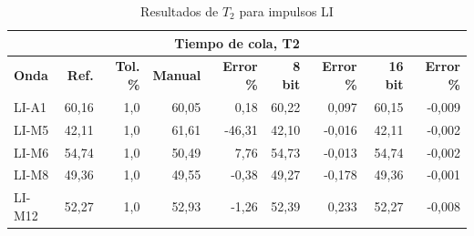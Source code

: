 \vspace{3\baselineskip}
\begin{table}[H]
    \centering
    \begin{tabular}{@{}lrrrrrrrr@{}}
        \toprule
        \multicolumn{9}{c}{\textbf{Tiempo de cola, T2}}                                                                                                                   \\ \midrule
        \textbf{Onda} & \textbf{Ref.} & \textbf{Tol. \%} & \textbf{Manual} & \textbf{Error \%} & \textbf{8 bit} & \textbf{Error \%} & \textbf{16 bit} & \textbf{Error \%} \\ \midrule
        LI-A1         & 60,16         & 1,0              & 60,05           & 0,18              & 60,22          & 0,097             & 60,15           & -0,009            \\ \midrule
        LI-M5         & 42,11         & 1,0              & 61,61           & -46,31            & 42,10          & -0,016            & 42,11           & -0,002            \\ \midrule
        LI-M6         & 54,74         & 1,0              & 50,49           & 7,76              & 54,73          & -0,013            & 54,74           & -0,002            \\ \midrule
        LI-M8         & 49,36         & 1,0              & 49,55           & -0,38             & 49,27          & -0,178            & 49,36           & -0,001            \\ \midrule
        LI-M12        & 52,27         & 1,0              & 52,93           & -1,26             & 52,39          & 0,233             & 52,27           & -0,008            \\ \bottomrule
    \end{tabular}
    \caption{Resultados de $T_2$ para impulsos LI}
    \label{tab:resultados_t2_li}
\end{table}
\vspace{3\baselineskip}

